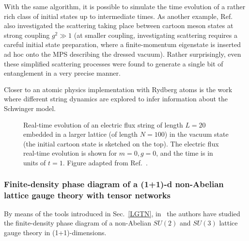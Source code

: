 \documentclass[epj,final]{svjour}
\begin{document}
With the same algorithm, it is possible to simulate the time evolution of a rather rich class of initial states up to intermediate times. As another example, Ref.~\cite{pichler2016real} also investigated the scattering taking place between cartoon meson states at strong coupling $g^2\gg 1$ (at smaller coupling, investigating scattering requires a careful initial state preparation, where a finite-momentum eigenstate is inserted ad hoc onto the MPS describing the dressed vacuum). Rather surprisingly, even these simplified scattering processes were found to generate a single bit of entanglement in a very precise manner. 

Closer to an atomic physics implementation with Rydberg atoms is the work \cite{notarnicola2019real} where different string dynamics are explored to infer information about the Schwinger model.

\begin{figure}
\begin{center}
\end{center}

\caption{Real-time evolution of an electric flux string of length $L=20$ embedded in a larger lattice (of length $N=100$) in the vacuum state (the initial cartoon state is sketched on the top). The electric flux real-time evolution is shown for $m=0, g=0$, and the time is in units of $t=1$. Figure adapted from Ref.~\cite{pichler2016real}.}
\label{fig:QLM_SB}
\end{figure}

\subsubsection{Finite-density phase diagram of a (1+1)-d non-Abelian lattice gauge theory with tensor networks\cite{silvi2017finite}}

By means of the tools introduced in Sec.~\ref{LGTN}, in~\cite{silvi2017finite,Silvi2019} the authors have studied the finite-density phase diagram of a non-Abelian $SU(2)$ and $SU(3)$ lattice gauge theory in (1+1)-dimensions. 
\end{document}
